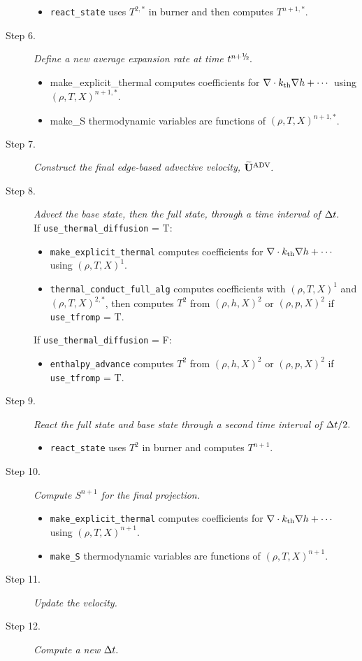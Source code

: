 \begin{description}
\begin{itemize}
\item {\tt react\_state} uses $T^{2,*}$ in burner and then computes $T^{n+1,*}$.
\end{itemize}
\item[Step 6.] {\em Define a new average expansion rate at time $t^\nph.$}
\begin{itemize}
\item {make\_explicit\_thermal} computes coefficients for 
$\nabla\cdot k_{\rm th}\nabla h + \cdots$ using $(\rho,T,X)^{n+1,*}$.
\item {make\_S} thermodynamic variables are functions of $(\rho,T,X)^{n+1,*}$.
\end{itemize}
\item[Step 7.] {\em Construct the final edge-based advective velocity, $\widetilde{\mathbf{U}}^{\mathrm{ADV}}.$}
\item[Step 8.] {\em Advect the base state, then the full state, through a time interval 
of $\Delta t.$}\\
If {\tt use\_thermal\_diffusion} = T:
\begin{itemize}
\item {\tt make\_explicit\_thermal} computes coefficients for 
$\nabla\cdot k_{\rm th}\nabla h + \cdots$ using $(\rho,T,X)^1$.
\item {\tt thermal\_conduct\_full\_alg} computes coefficients with $(\rho,T,X)^1$ and
$(\rho,T,X)^{2,*}$, then computes $T^{2}$ from $(\rho,h,X)^{2}$ or $(\rho,p,X)^{2}$ if 
{\tt use\_tfromp} = T.
\end{itemize}
If {\tt use\_thermal\_diffusion} = F:
\begin{itemize}
\item {\tt enthalpy\_advance} computes $T^2$ from $(\rho,h,X)^2$ or $(\rho,p,X)^2$
if {\tt use\_tfromp} = T.
\end{itemize}
\item[Step 9.] {\em React the full state and base state through a second time interval 
of $\Delta t/2.$}
\begin{itemize}
\item {\tt react\_state} uses $T^2$ in burner and computes $T^{n+1}$.
\end{itemize}
\item[Step 10.] {\em Compute $S^{n+1}$ for the final projection.}
\begin{itemize}
\item {\tt make\_explicit\_thermal} computes coefficients for 
$\nabla\cdot k_{\rm th}\nabla h + \cdots$ using $(\rho,T,X)^{n+1}$.
\item {\tt make\_S} thermodynamic variables are functions of $(\rho,T,X)^{n+1}$.
\end{itemize}
\item[Step 11.] {\em Update the velocity.}
\item[Step 12.] {\em Compute a new $\Delta t.$}
\end{description}
